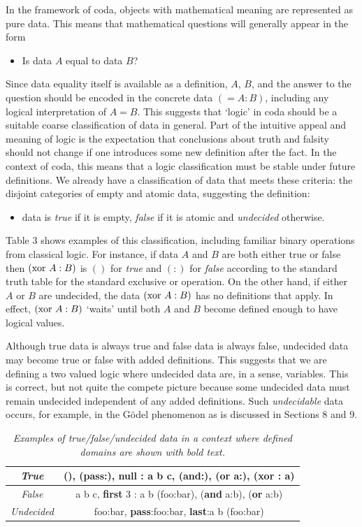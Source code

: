 \documentclass[11pt]{article}
\begin{document}
    In the framework of coda, objects with mathematical meaning are represented as pure data.  This means that mathematical 
questions will generally appear in the form 
\begin{itemize}
\item[] Is data $A$ equal to data $B$?
\end{itemize}
Since data equality itself is available as a definition, $A$, $B$, and the answer to the question should be 
encoded in the concrete data $(=A:B)$, including any logical interpretation of $A=B$\cite{sugar}.  
This suggests that `logic' in coda should be a suitable coarse classification of data in general.  Part of the 
intuitive appeal and meaning of logic is the expectation that conclusions about truth and falsity should 
not change if one introduces some new definition after the fact.  In the context of coda, this means that
a logic classification must be stable under future definitions.  We already have a classification of data 
that meets these criteria: the disjoint categories of empty and atomic data, suggesting the definition:  
\begin{itemize}
\item data is {\it true} if it is empty, {\it false} if it is atomic and {\it undecided} otherwise. 
\end{itemize}
Table 3 shows examples of this classification, including familiar binary operations from classical logic.   
For instance, if data $A$ and $B$ are both either true or false then $({\rm xor}\ A:B)$ is $()$ for {\it true} and $(:)$ for {\it false} according to the standard truth
 table for the standard exclusive or operation.  On the other hand, if either $A$ or $B$ are 
undecided, the data $({\rm xor}\ A:B)$ has no definitions that apply.  In effect, $({\rm xor}\ A:B)$ `waits' until both $A$ and $B$ become defined 
enough to have logical values. 

     Although true data is always true and false data is always false, undecided data may become true or false with added definitions.  
This suggests that we are defining a two valued logic where undecided data are, in a sense, variables.  This is correct, but 
not quite the compete picture because some undecided data must remain undecided independent of any added definitions. 
Such {\it undecidable} data occurs, for example, in the G\"{o}del phenomenon as is discussed in Sections 8 and 9. 
\begin{table}
\begin{center}
\begin{tabular}{ | c | c | }
\hline
 {\it True} & (), ({\bf pass}:), {\bf null} : a b c, ({\bf and}:), ({\bf or} a:), ({\bf xor} : a)  \\ 
 \hline
 {\it False} & a b c, {\bf first} 3 : a b (foo:bar), ({\bf and} a:b), ({\bf or} a:b)  \\  
 \hline
 {\it Undecided} & foo:bar, {\bf pass}:foo:bar, {\bf last}:a b (foo:bar)  \\   
 \hline
\end{tabular}
\end{center}
\caption{\label{ }{\it Examples of true/false/undecided data in a context where defined domains are shown with bold text.}}
\end{table}
\end{document}
